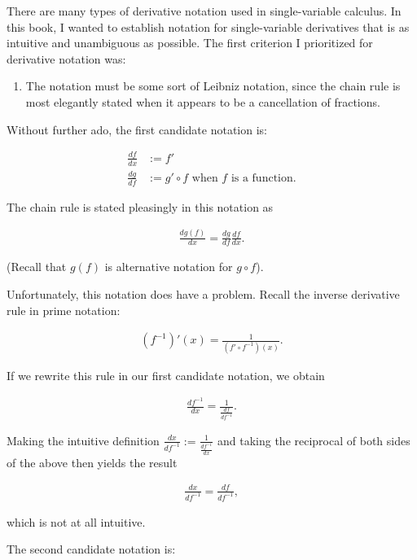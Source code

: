 There are many types of derivative notation used in single-variable calculus. In this book, I wanted to establish notation for single-variable derivatives that is as intuitive and unambiguous as possible. The first criterion I prioritized for derivative notation was:

\begin{enumerate}
    \item The notation must be some sort of Leibniz notation, since the chain rule is most elegantly stated when it appears to be a cancellation of fractions.
\end{enumerate}

Without further ado, the first candidate notation is:

\begin{align*}
    \frac{df}{dx} &:= f' \\
    \frac{dg}{df} &:= g' \circ f \text{ when $f$ is a function}.
\end{align*}

The chain rule is stated pleasingly in this notation as

\begin{align*}
    \frac{dg(f)}{dx} = \frac{dg}{df} \frac{df}{dx}.
\end{align*}

(Recall that $g(f)$ is alternative notation for $g \circ f$). 

Unfortunately, this notation does have a problem. Recall the inverse derivative rule in prime notation:

\begin{align*}
    (f^{-1})'(x) = \frac{1}{(f' \circ f^{-1})(x)}.
\end{align*}

If we rewrite this rule in our first candidate notation, we obtain

\begin{align*}
    \frac{df^{-1}}{dx} = \frac{1}{\frac{df}{df^{-1}}}.
\end{align*}

Making the intuitive definition $\frac{dx}{df^{-1}} := \frac{1}{\frac{df^{-1}}{dx}}$ and taking the reciprocal of both sides of the above then yields the result

\begin{align*}
    \frac{dx}{df^{-1}} = \frac{df}{df^{-1}},
\end{align*}

which is not at all intuitive.

The second candidate notation is:

